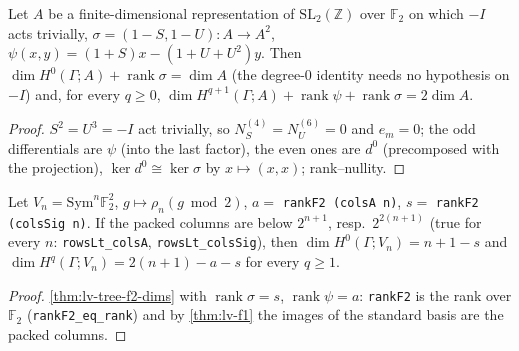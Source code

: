 \begin{theorem}\label{thm:lv-tree-f2-dims}
  \leanok
  Let $A$ be a finite-dimensional representation of $\mathrm{SL}_2(\mathbb Z)$ over $\mathbb F_2$ on which $-I$ acts trivially,
  $\sigma=(1-S,1-U)\colon A\to A^2$, $\psi(x,y)=(1+S)x-(1+U+U^2)y$.  Then $\dim H^0(\Gamma;A)+\operatorname{rank}\sigma=\dim A$ (the
  degree-$0$ identity needs no hypothesis on $-I$) and, for every $q\ge0$,
  $\dim H^{q+1}(\Gamma;A)+\operatorname{rank}\psi+\operatorname{rank}\sigma=2\dim A$.
\end{theorem}
\begin{proof}
  \leanok
  $S^2=U^3=-I$ act trivially, so $N_S^{(4)}=N_U^{(6)}=0$ and $e_m=0$; the odd differentials are $\psi$ (into the last factor), the
  even ones are $d^0$ (precomposed with the projection), $\ker d^0\cong\ker\sigma$ by $x\mapsto(x,x)$; rank--nullity.
\end{proof}

\begin{theorem}\label{thm:lv-v2-dims}
  \leanok
  Let $V_n=\mathrm{Sym}^n\mathbb F_2^2$, $g\mapsto\rho_n(g\bmod2)$, $a=$ \texttt{rankF2 (colsA n)}, $s=$ \texttt{rankF2 (colsSig n)}.  If the
  packed columns are below $2^{n+1}$, resp.\ $2^{2(n+1)}$ (true for every $n$: \texttt{rowsLt\_colsA}, \texttt{rowsLt\_colsSig}), then
  $\dim H^0(\Gamma;V_n)=n+1-s$ and $\dim H^{q}(\Gamma;V_n)=2(n+1)-a-s$ for every $q\ge1$.
\end{theorem}
\begin{proof}
  \leanok
  \ref{thm:lv-tree-f2-dims} with $\operatorname{rank}\sigma=s$, $\operatorname{rank}\psi=a$: \texttt{rankF2} is the rank over
  $\mathbb F_2$ (\texttt{rankF2\_eq\_rank}) and by \ref{thm:lv-f1} the images of the standard basis are the packed columns.
\end{proof}

